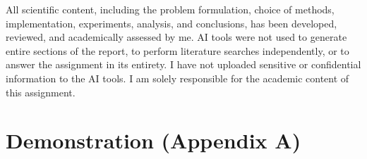 \documentclass[12pt,a4paper]{report}
\begin{document}
    All scientific content, including the problem formulation, choice of methods, implementation,
    experiments, analysis, and conclusions, has been developed, reviewed, and academically assessed
    by me. AI tools were not used to generate entire sections of the report, to perform literature
    searches independently, or to answer the assignment in its entirety. I have not uploaded
    sensitive or confidential information to the AI tools. I am solely responsible for the
    academic content of this assignment.


%
\printbibliography[heading=bibintoc,title={References}]

\cleardoublepage

\appendix

\chapter{Demonstration (Appendix A)}
\label{chap:appendix}

\begingroup
\footnotesize
\setlength{\tabcolsep}{4pt}
\end{document}

